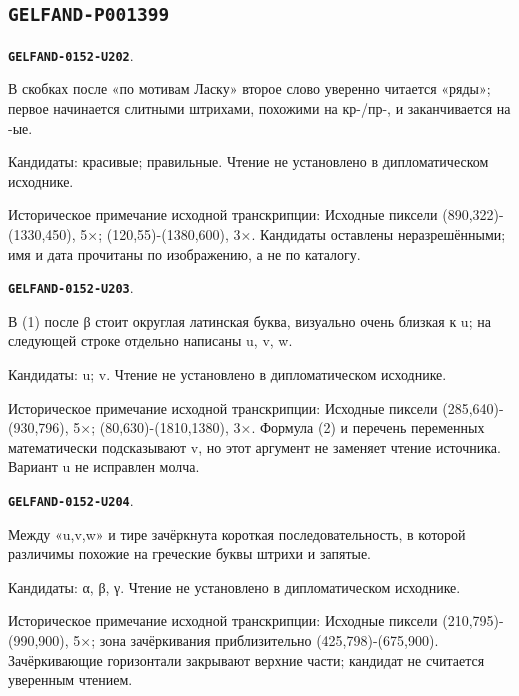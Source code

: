 \documentclass[11pt]{article}
\theoremstyle{definition}
\theoremstyle{remark}
\begin{document}
\subsection*{\texttt{GELFAND-P001399}}
\par\noindent\leavevmode{}\label{GELFAND-0152-U202}\label{GELFAND-P001399:heading-parenthesis:note}\textbf{\texttt{GELFAND-0152-U202}}.\nopagebreak[4]\par
В скобках после «по мотивам Ласку» второе слово уверенно читается «ряды»; первое начинается слитными штрихами, похожими на кр-/пр-, и заканчивается на -ые.\par
Кандидаты: красивые; правильные. Чтение не установлено в дипломатическом исходнике.\par
Историческое примечание исходной транскрипции: Исходные пиксели (890,322)-(1330,450), 5×; (120,55)-(1380,600), 3×. Кандидаты оставлены неразрешёнными; имя и дата прочитаны по изображению, а не по каталогу.\par\medskip
\par\noindent\leavevmode{}\label{GELFAND-0152-U203}\label{GELFAND-P001399:equation-1-second-variable:note}\textbf{\texttt{GELFAND-0152-U203}}.\nopagebreak[4]\par
В (1) после β стоит округлая латинская буква, визуально очень близкая к u; на следующей строке отдельно написаны u, v, w.\par
Кандидаты: u; v. Чтение не установлено в дипломатическом исходнике.\par
Историческое примечание исходной транскрипции: Исходные пиксели (285,640)-(930,796), 5×; (80,630)-(1810,1380), 3×. Формула (2) и перечень переменных математически подсказывают v, но этот аргумент не заменяет чтение источника. Вариант u не исправлен молча.\par\medskip
\par\noindent\leavevmode{}\label{GELFAND-0152-U204}\label{GELFAND-P001399:cancelled-coefficients:note}\textbf{\texttt{GELFAND-0152-U204}}.\nopagebreak[4]\par
Между «u,v,w» и тире зачёркнута короткая последовательность, в которой различимы похожие на греческие буквы штрихи и запятые.\par
Кандидаты: α, β, γ. Чтение не установлено в дипломатическом исходнике.\par
Историческое примечание исходной транскрипции: Исходные пиксели (210,795)-(990,900), 5×; зона зачёркивания приблизительно (425,798)-(675,900). Зачёркивающие горизонтали закрывают верхние части; кандидат не считается уверенным чтением.\par\medskip
\end{document}
